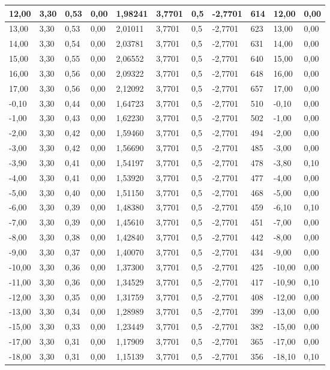 \begin{table}[H]
\begin{tabular}{|l|l|l|l|l|l|l|l|l|l|l|}
12,00	&3,30	&0,53	&0,00	&1,98241	&3,7701	&0,5	&-2,7701	&614	&12,00	&0,00\\\hline
13,00	&3,30	&0,53	&0,00	&2,01011	&3,7701	&0,5	&-2,7701	&623	&13,00	&0,00\\\hline
14,00	&3,30	&0,54	&0,00	&2,03781	&3,7701	&0,5	&-2,7701	&631	&14,00	&0,00\\\hline
15,00	&3,30	&0,55	&0,00	&2,06552	&3,7701	&0,5	&-2,7701	&640	&15,00	&0,00\\\hline
16,00	&3,30	&0,56	&0,00	&2,09322	&3,7701	&0,5	&-2,7701	&648	&16,00	&0,00\\\hline
17,00	&3,30	&0,56	&0,00	&2,12092	&3,7701	&0,5	&-2,7701	&657	&17,00	&0,00\\\hline
-0,10	&3,30	&0,44	&0,00	&1,64723	&3,7701	&0,5	&-2,7701	&510	&-0,10	&0,00\\\hline
-1,00	&3,30	&0,43	&0,00	&1,62230	&3,7701	&0,5	&-2,7701	&502	&-1,00	&0,00\\\hline
-2,00	&3,30	&0,42	&0,00	&1,59460	&3,7701	&0,5	&-2,7701	&494	&-2,00	&0,00\\\hline
-3,00	&3,30	&0,42	&0,00	&1,56690	&3,7701	&0,5	&-2,7701	&485	&-3,00	&0,00\\\hline
-3,90	&3,30	&0,41	&0,00	&1,54197	&3,7701	&0,5	&-2,7701	&478	&-3,80	&0,10\\\hline
-4,00	&3,30	&0,41	&0,00	&1,53920	&3,7701	&0,5	&-2,7701	&477	&-4,00	&0,00\\\hline
-5,00	&3,30	&0,40	&0,00	&1,51150	&3,7701	&0,5	&-2,7701	&468	&-5,00	&0,00\\\hline
-6,00	&3,30	&0,39	&0,00	&1,48380	&3,7701	&0,5	&-2,7701	&459	&-6,10	&0,10\\\hline
-7,00	&3,30	&0,39	&0,00	&1,45610	&3,7701	&0,5	&-2,7701	&451	&-7,00	&0,00\\\hline
-8,00	&3,30	&0,38	&0,00	&1,42840	&3,7701	&0,5	&-2,7701	&442	&-8,00	&0,00\\\hline
-9,00	&3,30	&0,37	&0,00	&1,40070	&3,7701	&0,5	&-2,7701	&434	&-9,00	&0,00\\\hline
-10,00	&3,30	&0,36	&0,00	&1,37300	&3,7701	&0,5	&-2,7701	&425	&-10,00	&0,00\\\hline
-11,00	&3,30	&0,36	&0,00	&1,34529	&3,7701	&0,5	&-2,7701	&417	&-10,90	&0,10\\\hline
-12,00	&3,30	&0,35	&0,00	&1,31759	&3,7701	&0,5	&-2,7701	&408	&-12,00	&0,00\\\hline
-13,00	&3,30	&0,34	&0,00	&1,28989	&3,7701	&0,5	&-2,7701	&399	&-13,00	&0,00\\\hline
-15,00	&3,30	&0,33	&0,00	&1,23449	&3,7701	&0,5	&-2,7701	&382	&-15,00	&0,00\\\hline
-17,00	&3,30	&0,31	&0,00	&1,17909	&3,7701	&0,5	&-2,7701	&365	&-17,00	&0,00\\\hline
-18,00	&3,30	&0,31	&0,00	&1,15139	&3,7701	&0,5	&-2,7701	&356	&-18,10	&0,10\\\hline
    \end{tabular}
    \label{table-shunt}
\end{table}

